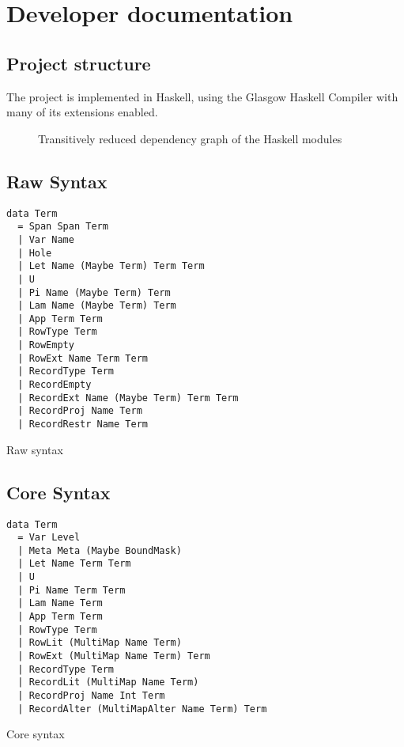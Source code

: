 \chapter{Developer documentation}\label{ch:devdocs}

\section{Project structure}

The project is implemented in Haskell, using the Glasgow Haskell Compiler with
many of its extensions enabled.


\begin{figure}
  \resizebox{\textwidth}{!}{}
  \caption{Transitively reduced dependency graph of the Haskell modules
  }\label{fig:modules}
\end{figure}

\section{Raw Syntax}

\begin{listing}
  \begin{verbatim}
data Term
  = Span Span Term
  | Var Name
  | Hole
  | Let Name (Maybe Term) Term Term
  | U
  | Pi Name (Maybe Term) Term
  | Lam Name (Maybe Term) Term
  | App Term Term
  | RowType Term
  | RowEmpty
  | RowExt Name Term Term
  | RecordType Term
  | RecordEmpty
  | RecordExt Name (Maybe Term) Term Term
  | RecordProj Name Term
  | RecordRestr Name Term
  \end{verbatim}
  \caption{Raw syntax }\label{lst:raw-adt}
\end{listing}

\section{Core Syntax}

\begin{listing}
  \begin{verbatim}
data Term
  = Var Level
  | Meta Meta (Maybe BoundMask)
  | Let Name Term Term
  | U
  | Pi Name Term Term
  | Lam Name Term
  | App Term Term
  | RowType Term
  | RowLit (MultiMap Name Term)
  | RowExt (MultiMap Name Term) Term
  | RecordType Term
  | RecordLit (MultiMap Name Term)
  | RecordProj Name Int Term
  | RecordAlter (MultiMapAlter Name Term) Term
  \end{verbatim}
  \caption{Core syntax }\label{lst:core-adt}
\end{listing}

